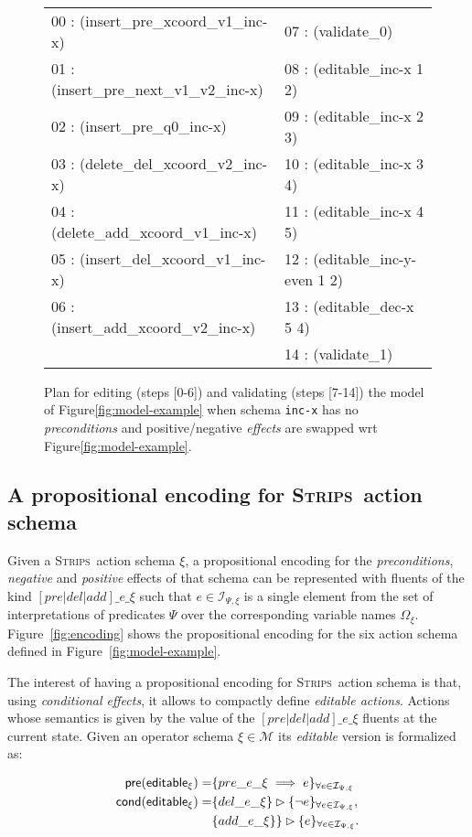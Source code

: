 \documentclass[letterpaper]{article} %
\newcommand{\pre}{\mathsf{pre}}     %
\newcommand{\cond}{\mathsf{cond}}   %
\newcommand{\strips}{\textsc{Strips}}     %
\begin{document}
\begin{figure}
{\tt\tiny
\begin{tabular}{ll}
00 : (insert\_pre\_xcoord\_v1\_inc-x)   & 07 : (validate\_0)\\
01 : (insert\_pre\_next\_v1\_v2\_inc-x) & 08 : (editable\_inc-x 1 2)\\
02 : (insert\_pre\_q0\_inc-x)           & 09 : (editable\_inc-x 2 3)\\
03 : (delete\_del\_xcoord\_v2\_inc-x)   & 10 : (editable\_inc-x 3 4) \\
04 : (delete\_add\_xcoord\_v1\_inc-x)   & 11 : (editable\_inc-x 4 5)\\
05 : (insert\_del\_xcoord\_v1\_inc-x)   & 12 : (editable\_inc-y-even 1 2)\\
06 : (insert\_add\_xcoord\_v2\_inc-x)   & 13 : (editable\_dec-x 5 4)\\
& 14 : (validate\_1)
\end{tabular}
}
 \caption{\small Plan for editing (steps [0-6]) and validating (steps [7-14]) the model of Figure\ref{fig:model-example} when schema {\tt\small inc-x} has no {\em preconditions} and positive/negative {\em effects} are swapped wrt Figure\ref{fig:model-example}.}
\label{fig:plan-pdistance}
\end{figure}



\subsection{A propositional encoding for \strips\ action schema}
Given a \strips\ action schema $\xi$, a propositional encoding for the {\em preconditions}, {\em negative} and {\em positive} effects of that schema can be represented with fluents of the kind $[pre|del|add]\_e\_\xi$ such that $e\in{\mathcal I}_{\Psi,\xi}$ is a single element from the set of interpretations of predicates $\Psi$ over the corresponding variable names $\Omega_\xi$. Figure~\ref{fig:encoding} shows the propositional encoding for the six action schema defined in Figure~\ref{fig:model-example}.

The interest of having a propositional encoding for \strips\ action schema is that, using {\em conditional effects}, it allows to compactly define {\em editable actions}. Actions whose semantics is given by the value of the $[pre|del|add]\_e\_\xi$ fluents at the current state. Given an operator schema $\xi\in\mathcal{M}$ its {\em editable} version is formalized as:
\begin{small}  
\begin{align*}
\hspace*{7pt}\pre(\mathsf{editable_{\xi}})=&\{pre\_e\_\xi\implies e\}_{\forall e\in{\mathcal I}_{\Psi,\xi}}\\
\cond(\mathsf{editable_{\xi}})=&\{del\_e\_\xi\}\rhd\{\neg e\}_{\forall e\in{\mathcal I}_{\Psi,\xi}},\\
&\{add\_e\_\xi\}\}\rhd\{e\}_{\forall e\in{\mathcal I}_{\Psi,\xi}}.
\end{align*}
\end{small}
\end{document}
